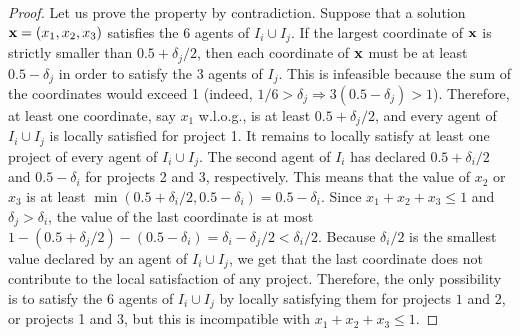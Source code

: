 \documentclass{article}
\begin{document}
\begin{proof}
Let us prove the property by contradiction. Suppose that a solution ${\bf x}=(x_1,x_2,x_3)$ satisfies the 6 agents of $I_i \cup I_j$. If the largest coordinate of ${\bf x}$ is strictly smaller than $0.5+\delta_{j}/2$, then each coordinate of ${\bf x}$ must be at least $0.5-\delta_{j}$ in order to satisfy the 3 agents of $I_j$. This is infeasible because the sum of the coordinates would exceed 1 (indeed, $1/6 > \delta_j \Rightarrow 3(0.5-\delta_j)> 1$). Therefore, at least one coordinate, say $x_1$ w.l.o.g., is at least $0.5+\delta_{j}/2$, and every agent of $I_i \cup I_j$ is locally satisfied for project 1. It remains to locally satisfy at least one project of every agent of $I_i \cup I_j$. The second agent of $I_i$ has declared $0.5+\delta_i/2$ and $0.5-\delta_i$ for projects 2 and 3, respectively. This means that the value of $x_2$ or $x_3$ is at least $\min(0.5+\delta_i/2,0.5-\delta_i)=0.5-\delta_i$. Since $x_1+x_2+x_3 \le 1$ and $\delta_j>\delta_i$, the value of the last coordinate is at most $1-(0.5+\delta_j/2)-(0.5-\delta_i)=\delta_i-\delta_j/2<\delta_i/2$. Because $\delta_i/2$ is the smallest value declared by an agent of $I_i \cup I_j$, we get that the last coordinate does not contribute to the local satisfaction of any project. Therefore, the only possibility is to satisfy the 6 agents of $I_i \cup I_j$ by locally satisfying them for projects $1$ and $2$, or projects 1 and 3, but this is incompatible with $x_1+x_2+x_3 \le 1$. \end{proof}
\end{document}

